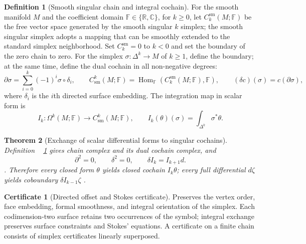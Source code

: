 \documentclass[12pt,a4paper,openany,notitlepage]{report}
\theoremstyle{plain}
\newtheorem{theorem}{Theorem}[chapter]
\theoremstyle{definition}
\newtheorem{definition}[theorem]{Definition}
\newtheorem*{certificate}{Certificate}
\theoremstyle{remark}
\begin{document}
\begin{CJK*}
\begin{definition}
[Smooth singular chain and integral cochain]\label{hgov:geo:def:singular}
For the smooth manifold $M$ and the coefficient domain $\mathbb F\in\{\mathbb R,\mathbb C\}$, for $k\ge0$, let $C_k^{\mathrm{sm}}(M;\mathbb F)$ be the free vector space generated by the smooth singular $k$ simplex; the smooth singular simplex adopts a mapping that can be smoothly extended to the standard simplex neighborhood. Set $C_k^{\mathrm{sm}}=0$ to $k<0$ and set the boundary of the zero chain to zero. For the simplex $\sigma:\Delta^k\to M$ of $k\ge1$, define the boundary; at the same time, define the dual cochain in all non-negative degrees: \[
\partial\sigma=\sum_{i=0}^k(-1)^i\sigma\circ\delta_i,
\qquad
C_{\mathrm{sm}}^k(M;\mathbb F)
=\operatorname{Hom}_{\mathbb F}(C_k^{\mathrm{sm}}(M;\mathbb F),\mathbb F),
\qquad
(\delta c)(\sigma)=c(\partial\sigma),
\] where $\delta_i$ is the $i$th directed surface embedding. The integration map in scalar form is \[
I_k:\Omega^k(M;\mathbb F)\longrightarrow C_{\mathrm{sm}}^k(M;\mathbb F),
\qquad I_k(\theta)(\sigma)=\int_{\Delta^k}\sigma^*\theta.
\]\end{definition}


\begin{theorem}
[Exchange of scalar differential forms to singular cochains]\label{hgov:geo:thm:integration}
Definition ~ \ref{hgov:geo:def:singular} gives chain complex and its dual cochain complex, and \[
\partial^2=0,\qquad\delta^2=0,\qquad
\delta I_k=I_{k+1}d.
\]. Therefore every closed form $\theta$ yields closed cochain $I_k\theta$; every full differential $d\zeta$ yields coboundary $\delta I_{k-1}\zeta$ \cite{ExtBottTu,ExtHatcher}.\end{theorem}


\begin{certificate}
[Directed offset and Stokes certificate]Preserves the vertex order, face embedding, formal smoothness, and integral orientation of the simplex. Each codimension-two surface retains two occurrences of the symbol; integral exchange preserves surface constraints and Stokes' equations. A certificate on a finite chain consists of simplex certificates linearly superposed.\end{certificate}



\end{CJK*}
\end{document}
